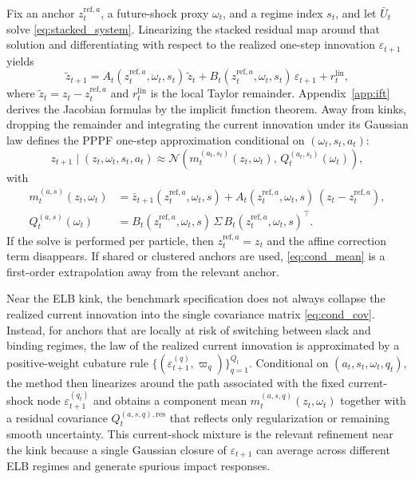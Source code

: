 \documentclass[11pt]{article}
\theoremstyle{remark}
\begin{document}
Fix an anchor $z_t^{\mathrm{ref},a}$, a future-shock proxy $\omega_t$, and a regime index $s_t$, and let $\bar U_t$ solve \eqref{eq:stacked_system}.
Linearizing the stacked residual map around that solution and differentiating with respect to the realized one-step innovation $\varepsilon_{t+1}$ yields
\begin{equation}
\tilde z_{t+1}
=
A_t(z_t^{\mathrm{ref},a},\omega_t,s_t)\,\tilde z_t
+
B_t(z_t^{\mathrm{ref},a},\omega_t,s_t)\,\varepsilon_{t+1}
+
r_t^{\mathrm{lin}},
\label{eq:lin_dev}
\end{equation}
where $\tilde z_t=z_t-z_t^{\mathrm{ref},a}$ and $r_t^{\mathrm{lin}}$ is the local Taylor remainder.
Appendix~\ref{app:ift} derives the Jacobian formulas by the implicit function theorem.
Away from kinks, dropping the remainder and integrating the current innovation under its Gaussian law defines the PPPF one-step approximation conditional on $(\omega_t,s_t,a_t)$:
\begin{equation}
z_{t+1}\mid (z_t,\omega_t,s_t,a_t)
\approx
\mathcal{N}\!\left(m_t^{(a_t,s_t)}(z_t,\omega_t),\,Q_t^{(a_t,s_t)}(\omega_t)\right),
\label{eq:cond_gauss}
\end{equation}
with
\begin{align}
m_t^{(a,s)}(z_t,\omega_t)
&=
\bar z_{t+1}(z_t^{\mathrm{ref},a},\omega_t,s)
+
A_t(z_t^{\mathrm{ref},a},\omega_t,s)\,(z_t-z_t^{\mathrm{ref},a}), \label{eq:cond_mean}\\
Q_t^{(a,s)}(\omega_t)
&=
B_t(z_t^{\mathrm{ref},a},\omega_t,s)\,\Sigma\,
B_t(z_t^{\mathrm{ref},a},\omega_t,s)^\top. \label{eq:cond_cov}
\end{align}
If the solve is performed per particle, then $z_t^{\mathrm{ref},a}=z_t$ and the affine correction term disappears.
If shared or clustered anchors are used, \eqref{eq:cond_mean} is a first-order extrapolation away from the relevant anchor.

Near the ELB kink, the benchmark specification does not always collapse the realized current innovation into the single covariance matrix \eqref{eq:cond_cov}.
Instead, for anchors that are locally at risk of switching between slack and binding regimes, the law of the realized current innovation is approximated by a positive-weight cubature rule $\{(\varepsilon_{t+1}^{(q)},\varpi_q)\}_{q=1}^{Q_t}$.
Conditional on $(a_t,s_t,\omega_t,q_t)$, the method then linearizes around the path associated with the fixed current-shock node $\varepsilon_{t+1}^{(q_t)}$ and obtains a component mean $m_t^{(a,s,q)}(z_t,\omega_t)$ together with a residual covariance $Q_t^{(a,s,q),\mathrm{res}}$ that reflects only regularization or remaining smooth uncertainty.
This current-shock mixture is the relevant refinement near the kink because a single Gaussian closure of $\varepsilon_{t+1}$ can average across different ELB regimes and generate spurious impact responses.
\end{document}
